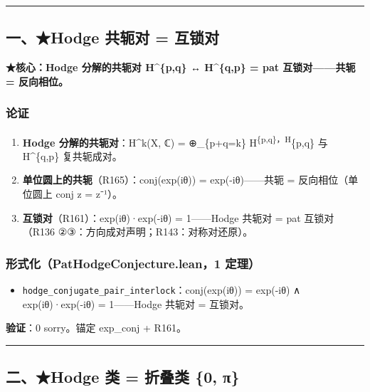 \documentclass[
]{article}
\providecommand{\tightlist}{%
  \setlength{\itemsep}{0pt}\setlength{\parskip}{0pt}}
\begin{document}
\begin{center}\rule{0.5\linewidth}{0.5pt}\end{center}

\subsection{一、★Hodge 共轭对 =
互锁对}\label{ux4e00hodge-ux5171ux8f6dux5bf9-ux4e92ux9501ux5bf9}

\textbf{★核心：Hodge 分解的共轭对 H\^{}\{p,q\} ↔ H\^{}\{q,p\} = pat
互锁对------共轭 = 反向相位。}

\subsubsection{论证}\label{ux8bbaux8bc1}

\begin{enumerate}
\def\labelenumi{\arabic{enumi}.}
\tightlist
\item
  \textbf{Hodge 分解的共轭对}：H\^{}k(X, ℂ) = ⊕\_\{p+q=k\}
  H\textsuperscript{\{p,q\}，H}\{p,q\} 与 H\^{}\{q,p\} 复共轭成对。
\item
  \textbf{单位圆上的共轭}（R165）：conj(exp(iθ)) = exp(-iθ)------共轭 =
  反向相位（单位圆上 conj z = z⁻¹）。
\item
  \textbf{互锁对}（R161）：exp(iθ)·exp(-iθ) = 1------Hodge 共轭对 = pat
  互锁对（R136 ②③：方向成对声明；R143：对称对还原）。
\end{enumerate}

\subsubsection{形式化（PatHodgeConjecture.lean，1
定理）}\label{ux5f62ux5f0fux5316pathodgeconjecture.lean1-ux5b9aux7406}

\begin{itemize}
\tightlist
\item
  \texttt{hodge\_conjugate\_pair\_interlock}：conj(exp(iθ)) = exp(-iθ) ∧
  exp(iθ)·exp(-iθ) = 1------Hodge 共轭对 = 互锁对。
\end{itemize}

\textbf{验证}：0 sorry。锚定 exp\_conj + R161。

\begin{center}\rule{0.5\linewidth}{0.5pt}\end{center}

\subsection{二、★Hodge 类 = 折叠类 \{0,
π\}}\label{ux4e8chodge-ux7c7b-ux6298ux53e0ux7c7b-0-ux3c0}
\end{document}
